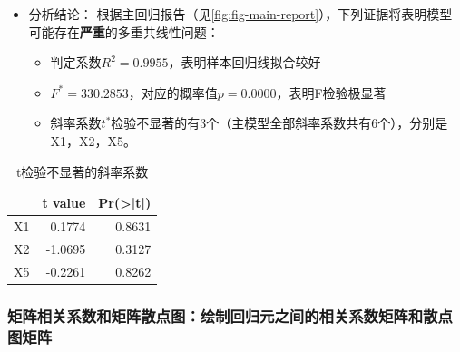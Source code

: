 \documentclass[12pt,(landscape,a4paper),(portrait,a4paper)]{article}
\providecommand{\tightlist}{%
  \setlength{\itemsep}{0pt}\setlength{\parskip}{0pt}}
\begin{document}
\begin{itemize}
\tightlist
\item
  分析结论：
  根据主回归报告（见\ref{fig:fig-main-report}），下列证据将表明模型可能存在\textbf{严重}的多重共线性问题：

  \begin{itemize}
  \tightlist
  \item
    判定系数\(R^2=0.9955\)，表明样本回归线拟合较好
  \item
    \(F^{\ast}=330.2853\)，对应的概率值\(p=0.0000\)，表明F检验极显著
  \item
    斜率系数\(t^\ast\)检验不显著的有3个（主模型全部斜率系数共有6个），分别是X1，X2，X5。
  \end{itemize}
\end{itemize}

\begin{table}

\caption{\label{tab:t-no}t检验不显著的斜率系数}
\centering
\begin{tabular}[t]{l|r|r}
\hline
  & t value & Pr(>|t|)\\
\hline
X1 & 0.1774 & 0.8631\\
\hline
X2 & -1.0695 & 0.3127\\
\hline
X5 & -0.2261 & 0.8262\\
\hline
\end{tabular}
\end{table}

\subsubsection{矩阵相关系数和矩阵散点图：绘制回归元之间的相关系数矩阵和散点图矩阵}
\end{document}
